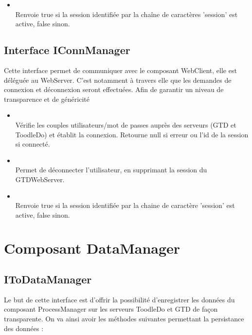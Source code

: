 	\begin{itemize}
		\item {} \\
		Renvoie true si la session identifiée par la chaîne de caractères 'session' est active, false sinon.
	\end{itemize}	
	
	
	\subsection{Interface IConnManager}
	Cette interface permet de communiquer avec le composant WebClient, elle est déléguée au WebServer. C'est notamment à travers elle que les demandes de connexion et déconnexion seront effectuées. Afin de garantir un niveau de transparence et de généricité
	
	\begin{itemize}
		\item {} \\
		Vérifie les couples utilisateurs/mot de passes auprès des serveurs (GTD et ToodleDo) et établit la connexion.
		Retourne null si erreur ou l'id de la session si connecté.
		\item {} \\
		Permet de déconnecter l'utilisateur, en supprimant la session du GTDWebServer.
		\item {} \\
		Renvoie true si la session identifiée par la chaine de caractère 'session' est active, false sinon.

	\end{itemize}	




\section{Composant DataManager}

\subsection{IToDataManager}

Le but de cette interface est d'offrir la possibilité d'enregistrer les données du composant ProcessManager sur les serveurs ToodleDo et GTD de façon transparente. On va ainsi avoir les méthodes suivantes permettant la persistance des données : \\

